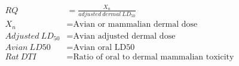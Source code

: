 \documentclass[fleqn, oneside, 11pt]{article}%
\begin{document}
\begin{preview}
\begin{align*}%
RQ & = \frac{X_{n}}{adjusted\: dermal\: LD_{50}}\nonumber \\
X_{n} & = \text{Avian or mammalian dermal dose}\nonumber \\
Adjusted \:LD_{50} & =  \text{Avian adjusted dermal dose} \nonumber \\
Avian \:LD{50} & =  \text{Avian oral LD50} \nonumber \\
Rat \:DTI & =  \text{Ratio of oral to dermal mammalian toxicity} \nonumber \\
\end{align*} 
\end{preview}
\end{document}
